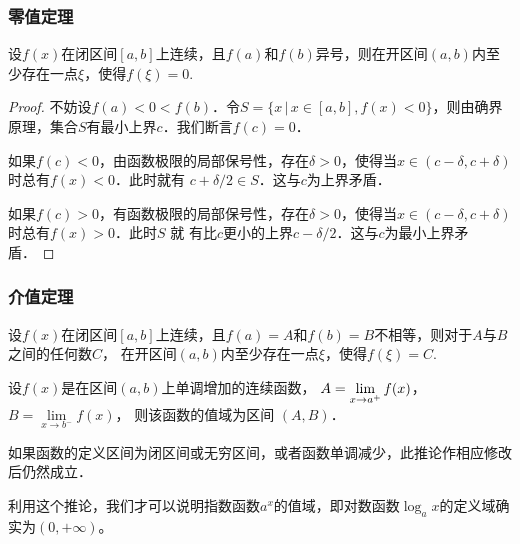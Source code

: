 \documentclass[14pt,notheorems,leqno,xcolor={rgb}]{beamer} %
\begin{document}
\begin{frame}
\frametitle{零值定理}
\small
\begin{theorem*}
设$f(x)$在闭区间$[a,b]$上连续，且$f(a)$和$f(b)$异号，则在开区间$(a,b)$内至少存在一点$\xi$，使得$f(\xi)=0$.
\end{theorem*}
\pause
\begin{proof}
不妨设$f(a)<0<f(b)$．令$S=\{x\,|\,x\in[a,b], f(x)<0\}$，则由确界原理，集合$S$有最小上界$c$．我们断言$f(c)=0$．
\par
如果$f(c)<0$，由函数极限的局部保号性，存在$\delta>0$，使得当$x\in(c-\delta,c+\delta)$时总有$f(x)<0$．此时就有
$c+\delta/2\in S$．这与$c$为上界矛盾．
\par
如果$f(c)>0$，有函数极限的局部保号性，存在$\delta>0$，使得当$x\in(c-\delta,c+\delta)$时总有$f(x)>0$．此时$S$ 就
有比$c$更小的上界$c-\delta/2$．这与$c$为最小上界矛盾．
\end{proof}
\end{frame}

\begin{frame}
\frametitle{介值定理}
\small
\begin{theorem*}
设$f(x)$在闭区间$[a,b]$上连续，且$f(a)=A$和$f(b)=B$不相等，则对于$A$与$B$之间的任何数$C$，
在开区间$(a,b)$内至少存在一点$\xi$，使得$f(\xi)=C$.
\end{theorem*}
\pause
\begin{corollary*}
设$f(x)$是在区间$(a,b)$上单调增加的连续函数，
$A=\lim\limits_{x\to a^+}f(x)$，$B=\lim\limits_{x\to b^-}f(x)$，
则该函数的值域为区间 $(A,B)$．
\end{corollary*}
\vpause
\begin{remark}
如果函数的定义区间为闭区间或无穷区间，或者函数单调减少，此推论作相应修改后仍然成立．
\end{remark}
\vpause
\begin{remark}
利用这个推论，我们才可以说明指数函数$a^x$的值域，即对数函数$\log_ax$的定义域确实为$(0,+\infty)$。
\end{remark}
\end{frame}
\end{document}
